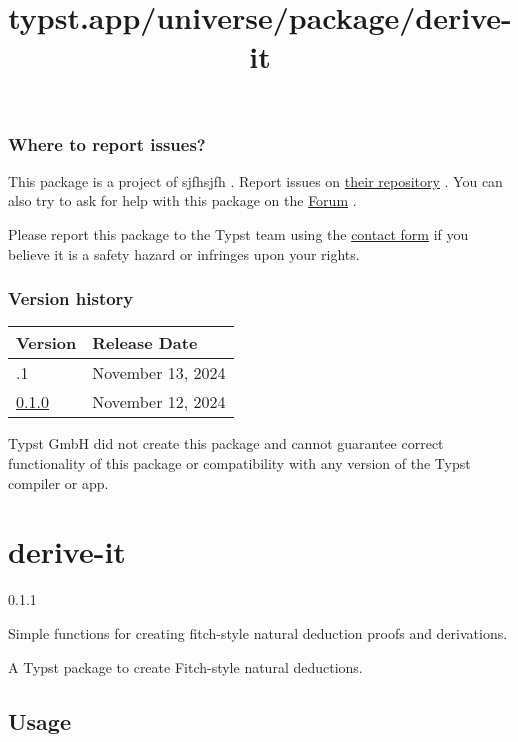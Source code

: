 \subsubsection{Where to report issues?}\label{where-to-report-issues}

This package is a project of sjfhsjfh . Report issues on
\href{https://github.com/sjfhsjfh/slashion}{their repository} . You can
also try to ask for help with this package on the
\href{https://forum.typst.app}{Forum} .

Please report this package to the Typst team using the
\href{https://typst.app/contact}{contact form} if you believe it is a
safety hazard or infringes upon your rights.

\label{versions}
\subsubsection{Version history}\label{version-history}

\begin{longtable}[]{@{}ll@{}}
\toprule\noalign{}
Version & Release Date \\
\midrule\noalign{}
\endhead
\bottomrule\noalign{}
\endlastfoot
0.1.1 & November 13, 2024 \\
\href{https://typst.app/universe/package/slashion/0.1.0/}{0.1.0} &
November 12, 2024 \\
\end{longtable}

Typst GmbH did not create this package and cannot guarantee correct
functionality of this package or compatibility with any version of the
Typst compiler or app.


\title{typst.app/universe/package/derive-it}

\label{banner}
\section{derive-it}\label{derive-it}

{ 0.1.1 }

Simple functions for creating fitch-style natural deduction proofs and
derivations.

\label{readme}
A Typst package to create Fitch-style natural deductions.


\subsection{Usage}\label{usage}


